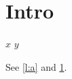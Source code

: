 \documentclass{article}
\newcounter{myc}
\begin{document}
\section{Intro}\label{s:a}
\begin{algorithmic}[1]
\State $x$\label{l:a}
\State $y$
\end{algorithmic}
See \cref{l:a} and \cref{s:a}.
\end{document}
